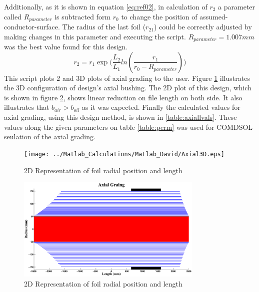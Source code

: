 Additionally, as it is shown in equation \ref{eq:ref02}, in calculation of $r_2$ a parameter called $R_{parameter}$ is subtracted form $r_0$  to change the position of assumed-conductor-surface. The radius of the last foil ($r_{21}$) could be correctly adjusted by making changes in this parameter and executing the script. $R_{parameter}=1.007mm$ was the best value found for this design.
\begin{equation}
  \label{eq:ref02}
  \displaystyle r_2= \displaystyle  r_{1} \displaystyle \exp\big( \displaystyle  \frac{L_2}{L_{1}}ln(\displaystyle \frac{r_1}{r_0-R_{parameter}})\big) 
\end{equation}
This script plots 2 and 3D plots of axial grading to the user. Figure \ref{Figure:21plot221} illustrates the 3D configuration of  design's axial bushing.  The 2D plot of this design, which is shown in figure \ref{Figure:21plot22}, shows linear reduction on file length on both side. It also illustrates that $b_{air}>b_{oil} $ as it was expected.  Finally the calculated values for axial grading, using this design method, is shown in \ref{table:axiallvals}. These values along the given parameters on table \ref{table:perm} was used for COMDSOL seulation of the axial grading.
\begin{figure}[h!]
  \centering
   \texttt{[image: ../Matlab\_Calculations/Matlab\_David/Axial3D.eps]} 
   \caption{2D Representation of foil radial position and length}
  	\label{Figure:21plot221}    
\end{figure}
\begin{figure}[h!]
  \centering
   \includegraphics[height = 5cm]{../Matlab_Calculations/Matlab_David/Axsial2D.eps} 
   \caption{2D Representation of foil radial position and length}
  	\label{Figure:21plot22}    
\end{figure}

